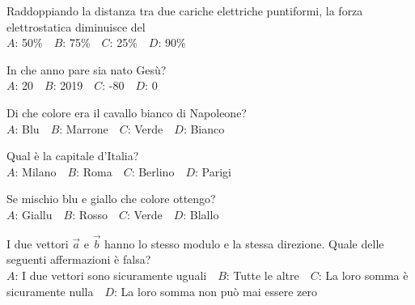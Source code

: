 \mcquestionfooter



\def\mcquestionnumber{5}


\mcquestionheader Raddoppiando la distanza tra due cariche elettriche puntiformi, la forza elettrostatica diminuisce del\\
{$A$}: 50\%\ \ {$B$}: 75\%\ \ {$C$}: 25\%\ \ {$D$}: 90\%\ \ 

\mcquestionfooter



\def\mcquestionnumber{6}


\mcquestionheader In che anno pare sia nato Gesù?\\
{$A$}: 20\ \ {$B$}: 2019\ \ {$C$}: -80\ \ {$D$}: 0\ \ 

\mcquestionfooter



\def\mcquestionnumber{7}


\mcquestionheader Di che colore era il cavallo bianco di Napoleone?\\
{$A$}: Blu\ \ {$B$}: Marrone\ \ {$C$}: Verde\ \ {$D$}: Bianco\ \ 

\mcquestionfooter



\def\mcquestionnumber{8}


\mcquestionheader Qual è la capitale d’Italia?\\
{$A$}: Milano\ \ {$B$}: Roma\ \ {$C$}: Berlino\ \ {$D$}: Parigi\ \ 

\mcquestionfooter



\def\mcquestionnumber{9}


\mcquestionheader Se mischio blu e giallo che colore ottengo?\\
{$A$}: Giallu\ \ {$B$}: Rosso\ \ {$C$}: Verde\ \ {$D$}: Blallo\ \ 

\mcquestionfooter



\def\mcquestionnumber{10}


\mcquestionheader I due vettori $\vec{a}$ e $\vec{b}$ hanno lo stesso modulo e la stessa direzione. Quale delle seguenti affermazioni è falsa?\\
{$A$}: I due vettori sono sicuramente uguali\ \ {$B$}: Tutte le altre\ \ {$C$}: La loro somma è sicuramente nulla\ \ {$D$}: La loro somma non può mai essere zero\ \ 

\mcquestionfooter



\def\mcquestionnumber{11}


